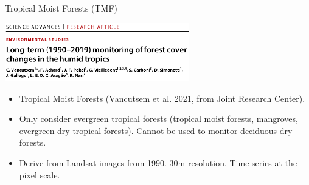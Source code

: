 \documentclass[10pt,table,dvipsnames,compress]{beamer}
\begin{document}
\begin{frame}[label={sec:org9260174}]{Tropical Moist Forests (TMF)}
\begin{center}
\includegraphics[width=8cm]{figs/fcc/Vancutsem2021.png}
\end{center}

\begin{itemize}
\item \href{https://forobs.jrc.ec.europa.eu/TMF}{Tropical Moist Forests} (Vancutsem et al. 2021, from Joint Research Center).
\item Only consider evergreen tropical forests (tropical moist forests, mangroves, evergreen dry tropical forests). Cannot be used to monitor deciduous dry forests.
\item Derive from Landsat images from 1990. 30m resolution. Time-series at the pixel scale.
\end{itemize}
\end{frame}
\end{document}
